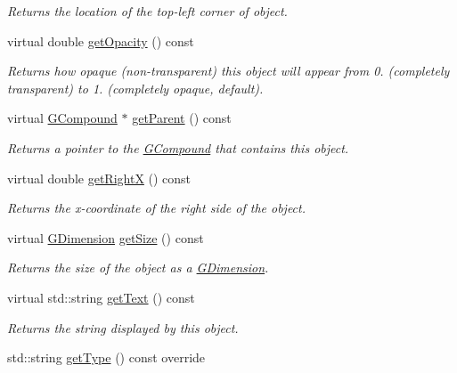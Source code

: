 \begin{DoxyCompactItemize}
\begin{DoxyCompactList}\small\item\em Returns the location of the top-\/left corner of object. \end{DoxyCompactList}\item 
virtual double \mbox{\hyperlink{classsgl_1_1GObject_a1ae3fc278cc5b71b9f2d96a8a83cdf26}{get\+Opacity}} () const
\begin{DoxyCompactList}\small\item\em Returns how opaque (non-\/transparent) this object will appear from 0. (completely transparent) to 1. (completely opaque, default). \end{DoxyCompactList}\item 
virtual \mbox{\hyperlink{classsgl_1_1GCompound}{G\+Compound}} $\ast$ \mbox{\hyperlink{classsgl_1_1GObject_a3e53cef70541b1a14eade4ad0984d0b4}{get\+Parent}} () const
\begin{DoxyCompactList}\small\item\em Returns a pointer to the {\ttfamily \mbox{\hyperlink{classsgl_1_1GCompound}{G\+Compound}}} that contains this object. \end{DoxyCompactList}\item 
virtual double \mbox{\hyperlink{classsgl_1_1GObject_a798cc79daaa10145b28f60bcdfdb0ee9}{get\+RightX}} () const
\begin{DoxyCompactList}\small\item\em Returns the {\itshape x}-\/coordinate of the right side of the object. \end{DoxyCompactList}\item 
virtual \mbox{\hyperlink{structsgl_1_1GDimension}{G\+Dimension}} \mbox{\hyperlink{classsgl_1_1GObject_a7b4eec96a2bdc6420695d5796a78eea9}{get\+Size}} () const
\begin{DoxyCompactList}\small\item\em Returns the size of the object as a {\ttfamily \mbox{\hyperlink{structsgl_1_1GDimension}{G\+Dimension}}}. \end{DoxyCompactList}\item 
virtual std\+::string \mbox{\hyperlink{classsgl_1_1GText_aff553c50924b836c29f146ed34a7c6ec}{get\+Text}} () const
\begin{DoxyCompactList}\small\item\em Returns the string displayed by this object. \end{DoxyCompactList}\item 
std\+::string \mbox{\hyperlink{classsgl_1_1GText_a9b72ede4ee8520f987a0c01e30654814}{get\+Type}} () const override

\end{DoxyCompactItemize}
